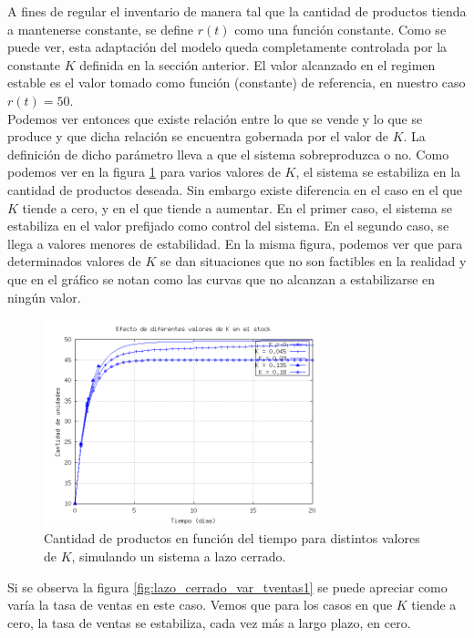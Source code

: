 \documentclass{sig-alternate}
\begin{document}
A fines de regular el inventario de manera tal que la cantidad de productos tienda a mantenerse constante, se define $r(t)$ como una función
constante.
Como se puede ver, esta adaptación del modelo queda completamente controlada por la constante $K$ definida en la sección anterior.  El valor alcanzado en el regimen estable
es el valor tomado como función (constante) de referencia, en nuestro caso $r(t) = 50$.\\
Podemos ver entonces que existe relación entre lo que se vende y lo que se produce y que dicha relación se encuentra gobernada por el valor de
$K$. La definición de dicho parámetro lleva a que el sistema sobreproduzca o no. Como podemos ver en la figura \ref{fig:lazo_cerrado_cant_unidades} para varios valores de $K$, 
el sistema se estabiliza en la cantidad de productos deseada. Sin embargo existe diferencia en el caso en el que $K$ tiende a cero, y en el que
tiende a aumentar. En el primer caso, el sistema se estabiliza en el valor prefijado como control del sistema. En el segundo caso, se llega a valores
menores de estabilidad. En la misma figura, podemos ver que para determinados valores de $K$ se dan situaciones que no son factibles en la realidad y que en el gráfico
se notan como las curvas que no alcanzan a estabilizarse en ningún valor.
\begin{figure}[h]
\begin{center}
\includegraphics[width=8cm]{../src/k_plot.png}
\caption{\label{fig:lazo_cerrado_cant_unidades}Cantidad de productos en función del tiempo para distintos valores de $K$, simulando un sistema
a lazo cerrado.}
\end{center}
\end{figure}
Si se observa la figura \ref{fig:lazo_cerrado_var_tventas1} se puede apreciar como varía la tasa de ventas en este caso. Vemos que para los casos 
en que $K$ tiende a cero, la tasa de ventas se estabiliza, cada vez más a largo plazo, en cero.
\end{document}
